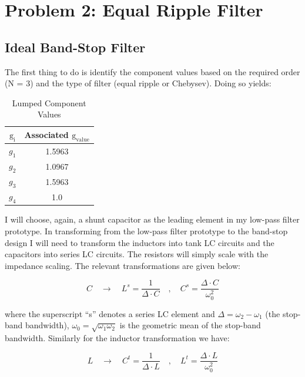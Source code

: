 \section*{Problem 2: Equal Ripple Filter}

\subsection*{Ideal Band-Stop Filter}
The first thing to do is identify the component values based on the required
order (N = 3) and the type of filter (equal ripple or Chebysev). Doing so yields:

\begin{table}[H]
    \centering
    \caption{Lumped Component Values}
    \label{tab:3a_lumped_component_values}
    \begin{tabular}{|c|c|}
        \hline $\text{g}_{\text{i}} $ & Associated $\text{g}_{\text{value}} $ \\
        \hline $ g_1 $ & 1.5963 \\
        \hline $ g_2 $ & 1.0967 \\
        \hline $ g_3 $ & 1.5963 \\
        \hline $ g_4 $ & 1.0 \\
        \hline
    \end{tabular}
\end{table}

I will choose, again, a shunt capacitor as the leading element in my low-pass
filter prototype. In transforming from the low-pass filter prototype to the
band-stop design I will need to transform the inductors into tank LC circuits
and the capacitors into series LC circuits. The resistors will simply scale with
the impedance scaling. The relevant transformations are given below:

\[ 
    C \quad \rightarrow \quad L^s = \frac{1}{\Delta \cdot C} \quad,\quad C^s = \frac{\Delta
    \cdot C}{\omega_0^2}
\]

where the superscript ``s'' denotes a series LC element and $\Delta = \omega_2
- \omega_1$ (the stop-band bandwidth), $\omega_0 = \sqrt{\omega_1\omega_2}$ is
the geometric mean of the stop-band bandwidth. Similarly for the inductor
transformation we have:

\[ 
L \quad \rightarrow \quad C^t = \frac{1}{\Delta \cdot L} \quad,\quad L^t = \frac{\Delta
\cdot L}{\omega_0^2}
\]

